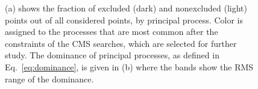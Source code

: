 \begin{figure}[tb!]
  \centering
    \caption{(a) shows the fraction of excluded
  (dark) and nonexcluded (light) points out of all considered points,
  by principal process. Color is assigned to the processes that are most common after the constraints of the CMS searches, which are selected for further study. The dominance
  of principal processes, as defined in Eq.~\ref{eq:dominance}, is given in (b) where the bands show the
  RMS range of the dominance. }
    \label{fig:TopoHisto}
\end{figure}
